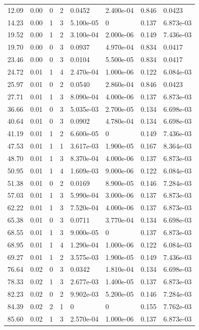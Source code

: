 \documentclass[preview]{standalone}
\begin{document}
{{\begin{tabular}{L{1.2cm}C{1.2cm} C{0.3cm}C{0.5cm} C{1.4cm}C{1.4cm} C{1.4cm}C{1.4cm}}
  12.09  &  0.00  & 0     &  2 &  0.0452  & 2.400e-04  & 0.846 &  0.0423   \\ 
  14.23  &  0.00  & 1     &  3 &  5.100e-05  & 0  & 0.137 &  6.873e-03   \\ 
  19.52  &  0.00  & 1     &  2 &  3.100e-04  & 2.000e-06  & 0.149 &  7.436e-03   \\ 
  19.70  &  0.00  & 0     &  3 &  0.0937  & 4.970e-04  & 0.834 &  0.0417   \\ 
  23.46  &  0.00  & 0     &  3 &  0.0104  & 5.500e-05  & 0.834 &  0.0417   \\ 
  24.72  &  0.01  & 1     &  4 &  2.470e-04  & 1.000e-06  & 0.122 &  6.084e-03   \\ 
  25.97  &  0.01  & 0     &  2 &  0.0540  & 2.860e-04  & 0.846 &  0.0423   \\ 
  27.71  &  0.01  & 1     &  3 &  8.090e-04  & 4.000e-06  & 0.137 &  6.873e-03   \\ 
  36.66  &  0.01  & 0     &  3 &  5.035e-03  & 2.700e-05  & 0.134 &  6.698e-03   \\ 
  40.64  &  0.01  & 0     &  3 &  0.0902  & 4.780e-04  & 0.134 &  6.698e-03   \\ 
  41.19  &  0.01  & 1     &  2 &  6.600e-05  & 0  & 0.149 &  7.436e-03   \\ 
  47.53  &  0.01  & 1     &  1 &  3.617e-03  & 1.900e-05  & 0.167 &  8.364e-03   \\ 
  48.70  &  0.01  & 1     &  3 &  8.370e-04  & 4.000e-06  & 0.137 &  6.873e-03   \\ 
  50.95  &  0.01  & 1     &  4 &  1.609e-03  & 9.000e-06  & 0.122 &  6.084e-03   \\ 
  51.38  &  0.01  & 0     &  2 &  0.0169  & 8.900e-05  & 0.146 &  7.284e-03   \\ 
  57.03  &  0.01  & 1     &  3 &  5.990e-04  & 3.000e-06  & 0.137 &  6.873e-03   \\ 
  62.22  &  0.01  & 1     &  3 &  7.520e-04  & 4.000e-06  & 0.137 &  6.873e-03   \\ 
  65.38  &  0.01  & 0     &  3 &  0.0711  & 3.770e-04  & 0.134 &  6.698e-03   \\ 
  68.55  &  0.01  & 1     &  3 &  9.000e-05  & 0  & 0.137 &  6.873e-03   \\ 
  68.95  &  0.01  & 1     &  4 &  1.290e-04  & 1.000e-06  & 0.122 &  6.084e-03   \\ 
  69.27  &  0.01  & 1     &  2 &  3.575e-03  & 1.900e-05  & 0.149 &  7.436e-03   \\ 
  76.64  &  0.02  & 0     &  3 &  0.0342  & 1.810e-04  & 0.134 &  6.698e-03   \\ 
  78.33  &  0.02  & 1     &  3 &  2.677e-03  & 1.400e-05  & 0.137 &  6.873e-03   \\ 
  82.23  &  0.02  & 0     &  2 &  9.902e-03  & 5.200e-05  & 0.146 &  7.284e-03   \\ 
  84.39  &  0.02  & 2     &  1 &  0  & 0  & 0.155 &  7.762e-03   \\ 
  85.60  &  0.02  & 1     &  3 &  2.570e-04  & 1.000e-06  & 0.137 &  6.873e-03   \\ 
\hline 
\end{tabular} 

}}
\end{document}
